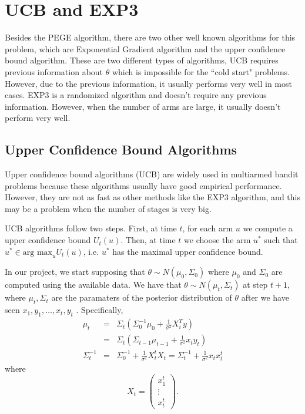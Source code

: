 \documentclass{article}
\theoremstyle{plain}
\theoremstyle{definition}
\begin{document}
\section{UCB and EXP3}
Besides the PEGE algorithm, there are two other well known algorithms for this problem, which are Exponential Gradient algorithm and the upper confidence bound algorithm. These are two different types of algorithms, UCB requires previous information about $\theta$ which is impossible for the ``cold start" problems. However, due to the previous information, it usually performs very well in most cases. EXP3 is a randomized algorithm and doesn't require any previous information. However, when the number of arms are large, it usually doesn't perform very well.



\subsection{Upper Confidence Bound Algorithms}

Upper confidence bound algorithms (UCB) are widely used in multiarmed
bandit problems because these algorithms usually have good empirical performance. 
However, they are not as fast as other methods like the EXP3 algorithm, and this may be a problem
when the number of stages is very big.

UCB algorithms follow two steps. First, at time $t$, for each arm
$u$ we compute a upper confidence bound $U_{t}\left(u\right)$. Then,
at time $t$ we choose the arm $u^{*}$ such that $u^{*}\in\mbox{arg max}_{u}U_{t}\left(u\right)$,
i.e. $u^{*}$ has the maximal upper confidence bound. 

In our project, we start supposing that $\theta\sim N\left(\mu_{0},\Sigma_{0}\right)$
where $\mu_{0}$ and $\Sigma_{0}$ are computed using the available
data. We have that $\theta\sim N\left(\mu_{t},\Sigma_{t}\right)$
at step $t+1$, where $\mu_{t},\Sigma_{t}$ are the paramaters of
the posterior distribution of $\theta$ after we have seen $x_{1},y_{1},\ldots,x_{t},y_{t}$
. Specifically,
\begin{eqnarray*}
\mu_{t} & = & \Sigma_{t}\left(\Sigma_{0}^{-1}\mu_{0}+\frac{1}{\sigma^{2}}X_{i}^{T}y\right)\\
 & = & \Sigma_{t}\left(\Sigma_{t-1}\mu_{t-1}+\frac{1}{\sigma^{2}}x_{t}y_{t}\right)\\
\Sigma_{t}^{-1} & = & \Sigma_{0}^{-1}+\frac{1}{\sigma^{2}}X_{t}^{t}X_{t}=\Sigma_{t}^{-1}+\frac{1}{\sigma^{2}}x_{t}x_{t}^{t}
\end{eqnarray*}
where 
\[
X_{t}=\left(\begin{array}{c}
x_{1}^{t}\\
\vdots\\
x_{t}^{t}
\end{array}\right).
\]
\end{document}
